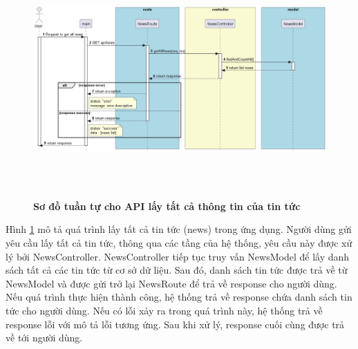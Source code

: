 \begin{enumerate}[a)]
\begin{figure}[H]
  \centering
  \includegraphics[width=16cm,height=9cm]{Images/server/sequence/server/getAllNews.png}
  \caption[Sơ đồ tuần tự cho API lấy tất cả thông tin của tin tức]{\bfseries \fontsize{12pt}{0pt}
  \selectfont Sơ đồ tuần tự cho API lấy tất cả thông tin của tin tức }
  \label{getAllNews} %
\end{figure}
Hình \ref{getAllNews} mô tả quá trình lấy tất cả tin tức (news) trong ứng dụng. Người dùng gửi yêu cầu lấy tất cả tin tức, thông qua các tầng của hệ thống, yêu cầu này được xử lý bởi NewsController. NewsController tiếp tục truy vấn NewsModel để lấy danh sách tất cả các tin tức từ cơ sở dữ liệu. Sau đó, danh sách tin tức được trả về từ NewsModel và được gửi trở lại NewsRoute để trả về response cho người dùng. Nếu quá trình thực hiện thành công, hệ thống trả về response chứa danh sách tin tức cho người dùng. Nếu có lỗi xảy ra trong quá trình này, hệ thống trả về response lỗi với mô tả lỗi tương ứng. Sau khi xử lý, response cuối cùng được trả về tới người dùng.



\end{enumerate}
